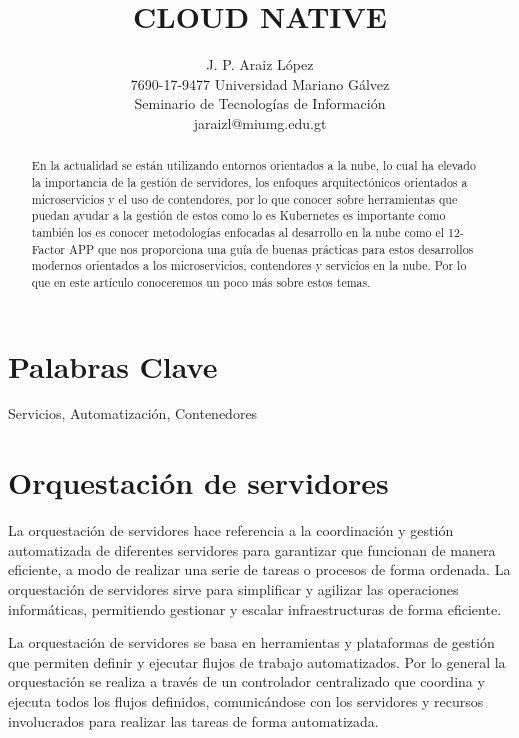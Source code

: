 \documentclass[12pt]{article}
\title{CLOUD NATIVE}
\author{J. P. Araiz López\\
  \small 7690-17-9477 Universidad Mariano Gálvez\\
  \small Seminario de Tecnologías de Información\\
  \small jaraizl@miumg.edu.gt
}
\begin{document}
\maketitle

\begin{abstract}
En la actualidad se están utilizando entornos orientados a la nube, lo cual ha elevado la importancia de la gestión de servidores, los enfoques arquitectónicos orientados a microservicios y el uso de contendores, por lo que conocer sobre herramientas que puedan ayudar a la gestión de estos como lo es Kubernetes es importante como también los es conocer metodologías enfocadas al desarrollo en la nube como el 12-Factor APP que nos proporciona una guía de buenas prácticas para estos desarrollos modernos orientados a los microservicios, contendores y servicios en la nube. Por lo que en este artículo conoceremos un poco más sobre estos temas.

\end{abstract}
\maketitle{}


\section*{Palabras Clave}
Servicios, Automatización, Contenedores

\section*{Orquestación de servidores}

La orquestación de servidores hace referencia a la coordinación y gestión automatizada de diferentes servidores para garantizar que funcionan de manera eficiente, a modo de realizar una serie de tareas o procesos de forma ordenada.
La orquestación de servidores sirve para simplificar y agilizar las operaciones informáticas, permitiendo gestionar y escalar infraestructuras de forma eficiente.

La orquestación de servidores se basa en herramientas y plataformas de gestión que permiten definir y ejecutar flujos de trabajo automatizados. Por lo general la orquestación se realiza a través de un controlador centralizado que coordina y ejecuta todos los flujos definidos, comunicándose con los servidores y recursos involucrados para realizar las tareas de forma automatizada.\\
\end{document}
